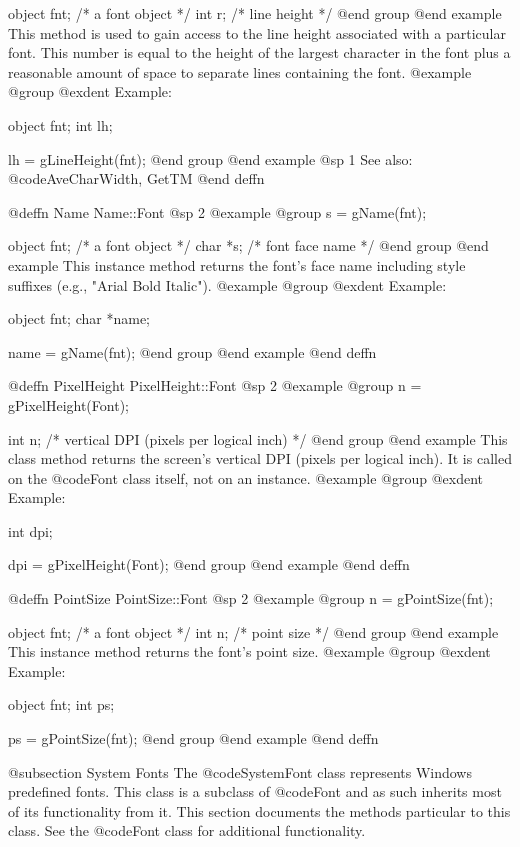 object   fnt;  /*  a font object  */
int      r;    /*  line height    */
@end group
@end example
This method is used to gain access to the line height associated with
a particular font.  This number is equal to the height of the largest
character in the font plus a reasonable amount of space to separate
lines containing the font.
@example
@group
@exdent Example:

object  fnt;
int     lh;

lh = gLineHeight(fnt);
@end group
@end example
@sp 1
See also:  @code{AveCharWidth, GetTM}
@end deffn




@deffn {Name} Name::Font
@sp 2
@example
@group
s = gName(fnt);

object  fnt;  /*  a font object  */
char    *s;   /*  font face name */
@end group
@end example
This instance method returns the font's face name including style
suffixes (e.g., "Arial Bold Italic").
@example
@group
@exdent Example:

object  fnt;
char    *name;

name = gName(fnt);
@end group
@end example
@end deffn




@deffn {PixelHeight} PixelHeight::Font
@sp 2
@example
@group
n = gPixelHeight(Font);

int  n;  /*  vertical DPI (pixels per logical inch)  */
@end group
@end example
This class method returns the screen's vertical DPI (pixels per
logical inch).  It is called on the @code{Font} class itself, not on
an instance.
@example
@group
@exdent Example:

int  dpi;

dpi = gPixelHeight(Font);
@end group
@end example
@end deffn




@deffn {PointSize} PointSize::Font
@sp 2
@example
@group
n = gPointSize(fnt);

object  fnt;  /*  a font object  */
int     n;    /*  point size     */
@end group
@end example
This instance method returns the font's point size.
@example
@group
@exdent Example:

object  fnt;
int     ps;

ps = gPointSize(fnt);
@end group
@end example
@end deffn








@subsection System Fonts
The @code{SystemFont} class represents Windows predefined fonts.
This class is a subclass of @code{Font} and as such inherits most
of its functionality from it.  This section documents the methods
particular to this class.  See the @code{Font} class for additional
functionality.









